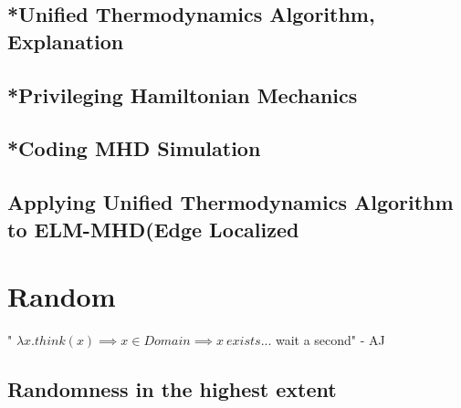 \section{*Unified Thermodynamics Algorithm, Explanation}

\section{*Privileging Hamiltonian Mechanics}
\section{*Coding MHD Simulation}
\section{Applying Unified Thermodynamics Algorithm to ELM-MHD(Edge Localized}

\chapter{Random}
" $\lambda x.think(x) \implies x \in Domain \implies x  \ exists$... wait a second" - AJ
\section{Randomness in the highest extent}
